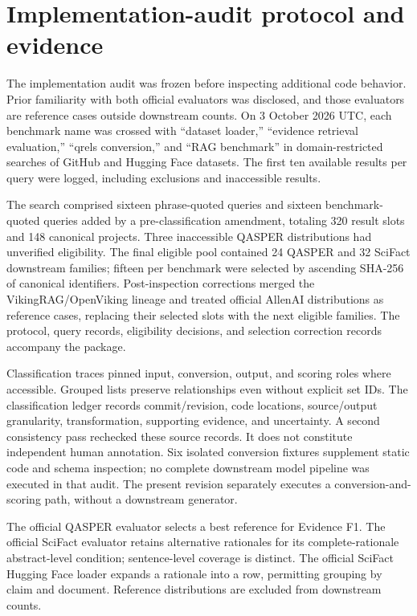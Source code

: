 \documentclass[twoside,a4paper,11pt]{article}
\begin{document}
\section{Implementation-audit protocol and evidence}
The implementation audit was frozen before inspecting additional code behavior. Prior familiarity with both official evaluators was disclosed, and those evaluators are reference cases outside downstream counts. On 3 October 2026 UTC, each benchmark name was crossed with ``dataset loader,'' ``evidence retrieval evaluation,'' ``qrels conversion,'' and ``RAG benchmark'' in domain-restricted searches of GitHub and Hugging Face datasets. The first ten available results per query were logged, including exclusions and inaccessible results.

The search comprised sixteen phrase-quoted queries and sixteen benchmark-quoted queries added by a pre-classification amendment, totaling 320 result slots and 148 canonical projects. Three inaccessible QASPER distributions had unverified eligibility. The final eligible pool contained 24 QASPER and 32 SciFact downstream families; fifteen per benchmark were selected by ascending SHA-256 of canonical identifiers. Post-inspection corrections merged the VikingRAG/OpenViking lineage and treated official AllenAI distributions as reference cases, replacing their selected slots with the next eligible families. The protocol, query records, eligibility decisions, and selection correction records accompany the package.

Classification traces pinned input, conversion, output, and scoring roles where accessible. Grouped lists preserve relationships even without explicit set IDs. The classification ledger records commit/revision, code locations, source/output granularity, transformation, supporting evidence, and uncertainty. A second consistency pass rechecked these source records. It does not constitute independent human annotation. Six isolated conversion fixtures supplement static code and schema inspection; no complete downstream model pipeline was executed in that audit. The present revision separately executes a conversion-and-scoring path, without a downstream generator.

The official QASPER evaluator selects a best reference for Evidence F1. The official SciFact evaluator retains alternative rationales for its complete-rationale abstract-level condition; sentence-level coverage is distinct. The official SciFact Hugging Face loader expands a rationale into a row, permitting grouping by claim and document. Reference distributions are excluded from downstream counts.
\end{document}
